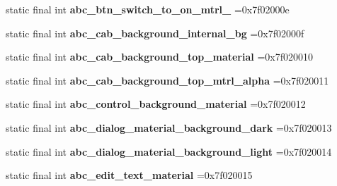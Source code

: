 \begin{DoxyCompactItemize}
\item 
\hypertarget{classcheck_1_1test_1_1_r_1_1drawable_ab5c6ed04f0b4a9fe2db971636660ceda}{}static final int {\bfseries abc\+\_\+btn\+\_\+switch\+\_\+to\+\_\+on\+\_\+mtrl\+\_} =0x7f02000e\label{classcheck_1_1test_1_1_r_1_1drawable_ab5c6ed04f0b4a9fe2db971636660ceda}

\item 
\hypertarget{classcheck_1_1test_1_1_r_1_1drawable_a88816021db849226d72642f31c61fefb}{}static final int {\bfseries abc\+\_\+cab\+\_\+background\+\_\+internal\+\_\+bg} =0x7f02000f\label{classcheck_1_1test_1_1_r_1_1drawable_a88816021db849226d72642f31c61fefb}

\item 
\hypertarget{classcheck_1_1test_1_1_r_1_1drawable_a2824c7123f5ad24066fe834950d31103}{}static final int {\bfseries abc\+\_\+cab\+\_\+background\+\_\+top\+\_\+material} =0x7f020010\label{classcheck_1_1test_1_1_r_1_1drawable_a2824c7123f5ad24066fe834950d31103}

\item 
\hypertarget{classcheck_1_1test_1_1_r_1_1drawable_a6557211581e451c371d28e2bfb481656}{}static final int {\bfseries abc\+\_\+cab\+\_\+background\+\_\+top\+\_\+mtrl\+\_\+alpha} =0x7f020011\label{classcheck_1_1test_1_1_r_1_1drawable_a6557211581e451c371d28e2bfb481656}

\item 
\hypertarget{classcheck_1_1test_1_1_r_1_1drawable_a61fe81a45fcbbc4ca68d61816e58978b}{}static final int {\bfseries abc\+\_\+control\+\_\+background\+\_\+material} =0x7f020012\label{classcheck_1_1test_1_1_r_1_1drawable_a61fe81a45fcbbc4ca68d61816e58978b}

\item 
\hypertarget{classcheck_1_1test_1_1_r_1_1drawable_abeb81f4b1c5401054a8515b67c8cad46}{}static final int {\bfseries abc\+\_\+dialog\+\_\+material\+\_\+background\+\_\+dark} =0x7f020013\label{classcheck_1_1test_1_1_r_1_1drawable_abeb81f4b1c5401054a8515b67c8cad46}

\item 
\hypertarget{classcheck_1_1test_1_1_r_1_1drawable_ad7907477e7a3a154b9e773038df6a18b}{}static final int {\bfseries abc\+\_\+dialog\+\_\+material\+\_\+background\+\_\+light} =0x7f020014\label{classcheck_1_1test_1_1_r_1_1drawable_ad7907477e7a3a154b9e773038df6a18b}

\item 
\hypertarget{classcheck_1_1test_1_1_r_1_1drawable_a6bfccbf9574e7197af951d440c78e13b}{}static final int {\bfseries abc\+\_\+edit\+\_\+text\+\_\+material} =0x7f020015\label{classcheck_1_1test_1_1_r_1_1drawable_a6bfccbf9574e7197af951d440c78e13b}


\end{DoxyCompactItemize}

